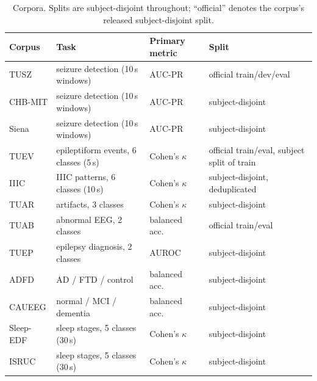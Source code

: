 \begin{table}[t]
\centering
\small
\caption{Corpora. Splits are subject-disjoint throughout; ``official''
denotes the corpus's released subject-disjoint split.}
\label{tab:corpora}
\begin{tabular}{llll}
\toprule
Corpus & Task & Primary metric & Split \\
\midrule
TUSZ & seizure detection (10\,s windows) & AUC-PR & official train/dev/eval \\
CHB-MIT & seizure detection (10\,s windows) & AUC-PR & subject-disjoint \\
Siena & seizure detection (10\,s windows) & AUC-PR & subject-disjoint \\
TUEV & epileptiform events, 6 classes (5\,s) & Cohen's $\kappa$ & official train/eval, subject split of train \\
IIIC & IIIC patterns, 6 classes (10\,s) & Cohen's $\kappa$ & subject-disjoint, deduplicated \\
TUAR & artifacts, 3 classes & Cohen's $\kappa$ & subject-disjoint \\
TUAB & abnormal EEG, 2 classes & balanced acc.\ & official train/eval \\
TUEP & epilepsy diagnosis, 2 classes & AUROC & subject-disjoint \\
ADFD & AD / FTD / control & balanced acc.\ & subject-disjoint \\
CAUEEG & normal / MCI / dementia & balanced acc.\ & subject-disjoint \\
Sleep-EDF & sleep stages, 5 classes (30\,s) & Cohen's $\kappa$ & subject-disjoint \\
ISRUC & sleep stages, 5 classes (30\,s) & Cohen's $\kappa$ & subject-disjoint \\
\bottomrule
\end{tabular}
\end{table}

